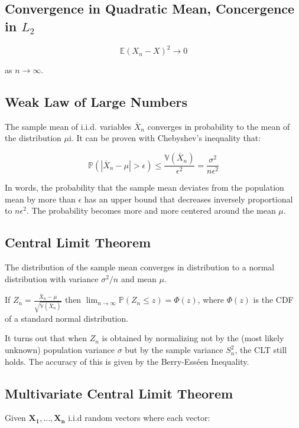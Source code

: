 \subsection{Convergence in Quadratic Mean, Concergence in $L_2$}

\begin{equation}
\mathbb{E}(X_n - X)^2 \rightarrow 0
\end{equation}

as $n\rightarrow \infty$.

\subsection{Weak Law of Large Numbers}

The sample mean of i.i.d. variables  $\overline{X}_n$ converges in probability to the mean of the distribution $\mu$i. It can be proven with Chebyshev's inequality that:

\begin{equation}
\mathbb{P}(|\overline{X}_n-\mu|>\epsilon) \leq \frac{\mathbb{V}(\overline{X}_n)}{\epsilon^2}=\frac{\sigma^2}{n \epsilon^2}
\end{equation}

In words, the probability that the sample mean deviates from the population mean by more than $\epsilon$ has an upper bound that decreases inversely proportional to $n\epsilon^2$. The probability becomes more and more centered around the mean $\mu$.

\subsection{Central Limit Theorem}
The distribution of the sample mean converges in distribution to a normal distribution with variance $\sigma^2/n$ and mean $\mu$.

If $Z_n = \frac{\overline{X}_n - \mu}{\sqrt{\mathbb{V}(\overline{X}_n)}}$ then $\lim_{n\rightarrow \infty} \mathbb{P}(Z_n \leq z) = \Phi(z)$, where $\Phi(z)$ is the CDF of a standard normal distribution. 

It turns out that when $Z_n$ is obtained by normalizing not by the (most likely unknown) population variance $\sigma$ but by the sample variance $S_n^2$, the CLT still holds. The accuracy of this is given by the Berry-Ess\'een Inequality.


\subsection{Multivariate Central Limit Theorem}
Given $\mathbf{X_1, ... ,X_n}$ i.i.d random vectors where each vector:

